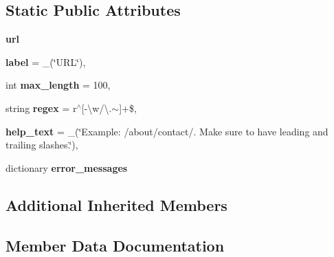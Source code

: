 \subsection*{Static Public Attributes}
\begin{DoxyCompactItemize}
\item 
\mbox{\label{classdjango_1_1contrib_1_1flatpages_1_1forms_1_1_flatpage_form_a53fbfb9eaa4151791f5344fdccfb408c}} 
{\bfseries url}
\item 
\mbox{\label{classdjango_1_1contrib_1_1flatpages_1_1forms_1_1_flatpage_form_a683d3244ccfa5da1da526a6c6d0554ab}} 
{\bfseries label} = \+\_\+(\char`\"{}U\+RL\char`\"{}),
\item 
\mbox{\label{classdjango_1_1contrib_1_1flatpages_1_1forms_1_1_flatpage_form_a986c62665e93bc659e5e7e07288e3bba}} 
int {\bfseries max\+\_\+length} = 100,
\item 
\mbox{\label{classdjango_1_1contrib_1_1flatpages_1_1forms_1_1_flatpage_form_a1aeae435c165e87afd3d2579cacafeba}} 
string {\bfseries regex} = r\textquotesingle{}$^\wedge$\mbox{[}-\/\textbackslash{}w/\textbackslash{}.$\sim$\mbox{]}+\$\textquotesingle{},
\item 
\mbox{\label{classdjango_1_1contrib_1_1flatpages_1_1forms_1_1_flatpage_form_a04c115222b5c66db0f5245d096c263a1}} 
{\bfseries help\+\_\+text} = \+\_\+(\char`\"{}Example\+: \textquotesingle{}/about/contact/\textquotesingle{}. Make sure to have leading and trailing slashes.\char`\"{}),
\item 
dictionary {\bfseries error\+\_\+messages}
\end{DoxyCompactItemize}
\subsection*{Additional Inherited Members}


\subsection{Member Data Documentation}
\mbox{\label{classdjango_1_1contrib_1_1flatpages_1_1forms_1_1_flatpage_form_ac028cb4951b8d6887280108ba9ecf7ff}} 
